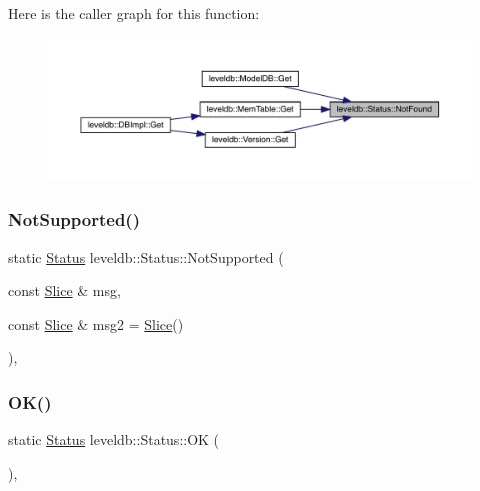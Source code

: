 Here is the caller graph for this function\+:
\nopagebreak
\begin{figure}[H]
\begin{center}
\leavevmode
\includegraphics[width=350pt]{classleveldb_1_1_status_a9e5beb5b2e758f041e0c012426e7b1b8_icgraph}
\end{center}
\end{figure}
\mbox{\label{classleveldb_1_1_status_a66c6b7171cedb55651e34e5df9a14705}} 
\subsubsection{\texorpdfstring{NotSupported()}{NotSupported()}}
{\footnotesize\ttfamily static \mbox{\hyperlink{classleveldb_1_1_status}{Status}} leveldb\+::\+Status\+::\+Not\+Supported (\begin{DoxyParamCaption}\item[{const \mbox{\hyperlink{classleveldb_1_1_slice}{Slice}} \&}]{msg,  }\item[{const \mbox{\hyperlink{classleveldb_1_1_slice}{Slice}} \&}]{msg2 = {\ttfamily \mbox{\hyperlink{classleveldb_1_1_slice}{Slice}}()} }\end{DoxyParamCaption})\hspace{0.3cm}{\ttfamily [inline]}, {\ttfamily [static]}}

\mbox{\label{classleveldb_1_1_status_a8e3720d233281c874a53c17e081f51b3}} 
\subsubsection{\texorpdfstring{OK()}{OK()}}
{\footnotesize\ttfamily static \mbox{\hyperlink{classleveldb_1_1_status}{Status}} leveldb\+::\+Status\+::\+OK (\begin{DoxyParamCaption}{ }\end{DoxyParamCaption})\hspace{0.3cm}{\ttfamily [inline]}, {\ttfamily [static]}}

